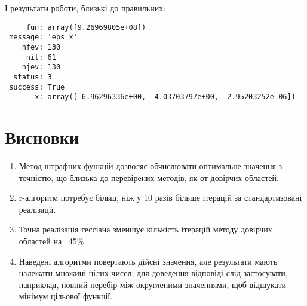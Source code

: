 \documentclass[12pt]{report}
\begin{document}
    І результати роботи, близькі до правильних:

    \begin{verbatim}
     fun: array([9.26969805e+08])
 message: 'eps_x'
    nfev: 130
     nit: 61
    njev: 130
  status: 3
 success: True
       x: array([ 6.96296336e+00,  4.03703797e+00, -2.95203252e-06])
    \end{verbatim}

    \section*{Висновки}

    \begin{enumerate}
        \item Метод штрафних функцій дозволяє обчислювати оптимальне значення з точністю, що близька до перевірених
        методів, як от довірчих областей.
        \item r-алгоритм потребує більш, ніж у 10 разів більше ітерацій за стандартизовані реалізації.
        \item Точна реалізація гессіана зменшує кількість ітерацій методу довірчих областей на ~45\%.
        \item Наведені алгоритми повертають дійсні значення, але результати мають належати множині цілих чисел; для
        доведення відповіді слід застосувати, наприклад, повний перебір між округленими значеннями, щоб відшукати
        мінімум цільової функції.
    \end{enumerate}
\end{document}
